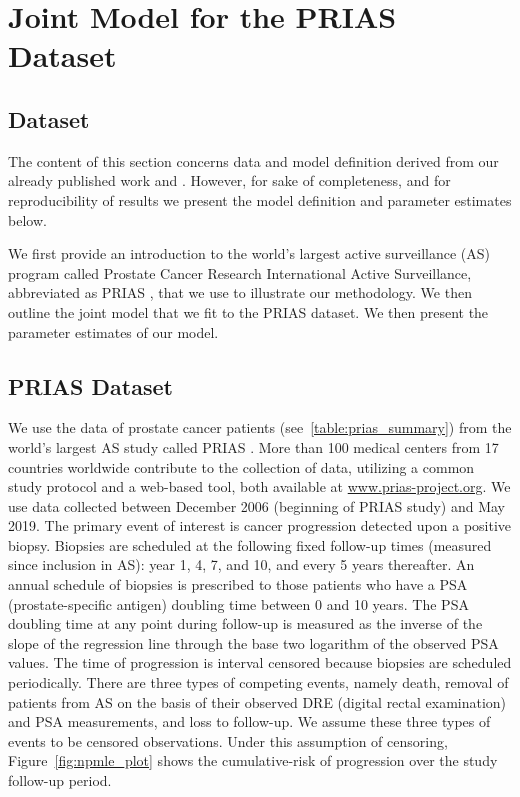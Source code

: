 \section{Joint Model for the PRIAS Dataset}
\label{sec:param_estimates_jm_fit_prias}
\subsection{Dataset}
The content of this section concerns data and model definition derived from our already published work \citet{tomer2019personalized} and \citet{tomer2020webapp}. However, for sake of completeness, and for reproducibility of results we present the model definition and parameter estimates below.

We first provide an introduction to the world's largest active surveillance (AS) program called Prostate Cancer Research International Active Surveillance, abbreviated as PRIAS \citep{bokhorst2016decade}, that we use to illustrate our methodology. We then outline the joint model that we fit to the PRIAS dataset. We then present the parameter estimates of our model.

\subsection{PRIAS Dataset}
We use the data of prostate cancer patients (see~\ref{table:prias_summary}) from the world's largest AS study called PRIAS \citep{bokhorst2016decade}. More than 100 medical centers from 17 countries worldwide contribute to the collection of data, utilizing a common study protocol and a web-based tool, both available at \url{www.prias-project.org}. We use data collected between December 2006 (beginning of PRIAS study) and May 2019. The primary event of interest is cancer progression detected upon a positive biopsy. Biopsies are scheduled at the following fixed follow-up times (measured since inclusion in AS): year 1, 4, 7, and 10, and every 5 years thereafter. An annual schedule of biopsies is prescribed to those patients who have a PSA (prostate-specific antigen) doubling time between 0 and 10 years. The PSA doubling time at any point during follow-up is measured as the inverse of the slope of the regression line through the base two logarithm of the observed PSA values. The time of progression is interval censored because biopsies are scheduled periodically. There are three types of competing events, namely death, removal of patients from AS on the basis of their observed DRE (digital rectal examination) and PSA measurements, and loss to follow-up. We assume these three types of events to be censored observations. Under this assumption of censoring, Figure~\ref{fig:npmle_plot} shows the cumulative-risk of progression over the study follow-up period.

